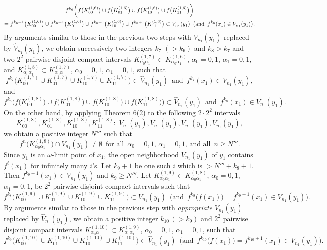 \documentclass[12pt]{article}
\newcommand{\al}{\alpha}
\begin{document}
\begin{multline*}
$$
f^{k_6}\bigg(f\big(K_{00}^{(1,6)}\big) \cup f\big(K_{01}^{(1,6)}\big) \cup f\big(K_{10}^{(1,6)}\big) \cup f\big(K_{11}^{(1,6)}\big)\bigg) \\ = f^{k_6+1}\big(K_{00}^{(1,6)}\big) \cup f^{k_6+1}\big(K_{01}^{(1,6)}\big) \cup f^{k_6+1}\big(K_{10}^{(1,6)}\big) \cup f^{k_6+1}\big(K_{11}^{(1,6)}\big)\subset V_{n_1}(y_1) \,\,\, \big(\text{and} \,\,\, f^{k_6}(x_1) \in V_{n_1}(y_1)\big).
$$
\end{multline*}
\indent By arguments similar to those in the previous two steps with $V_{n_1}(y_1)$ replaced by $\widehat V_{n_1}(y_1)$, we obtain successively two integers $k_7$ $(> k_6)$ and $k_8 > k_7$ and two $2^2$ pairwise disjoint compact intervals $K_{\al_0\al_1}^{(1,7)} \subset K_{\al_0\al_1}^{(1,6)}$, $\al_0 = 0, 1$, $\al_1 = 0, 1$, and $K_{\al_0\al_1}^{(1,8)} \subset K_{\al_0\al_1}^{(1,7)}$, $\al_0 = 0, 1$, $\al_1 = 0, 1$, such that 
$$
f^{k_7}\big(K_{00}^{(1,7)} \cup K_{01}^{(1,7)} \cup K_{10}^{(1,7)} \cup K_{11}^{(1,7)}\big) \subset \widehat V_{n_1}(y_1) \,\,\, \text{and} \,\,\, f^{k_7}(x_1) \in V_{n_1}(y_1),
$$and
$$
f^{k_8}\bigg(f\big(K_{00}^{(1,8)}\big) \cup f\big(K_{01}^{(1,8)}\big) \cup f\big(K_{10}^{(1,8)}\big) \cup f\big(K_{11}^{(1,8)}\big)\bigg) \subset \widehat V_{n_1}(y_1) \,\,\, \text{and} \,\,\, f^{k_8}(x_1) \in V_{n_1}(y_1).%
$$
\indent On the other hand, by applying Theorem 6(2) to the following $2 \cdot 2^2$ intervals
$$
K_{00}^{(1,8)}, K_{01}^{(1,8)}, K_{10}^{(1,8)}, K_{11}^{(1,8)}: \,\, V_{n_1}(y_1), V_{n_1}(y_1), V_{n_1}(y_1), V_{n_1}(y_1),
$$ 
we obtain a positive integer $N'''$ such that 
$$
f^n\big(K_{\al_0\al_1}^{(1,8)}\big) \cap V_{n_1}(y_1) \ne \emptyset \,\,\, \text{for all} \,\,\, \al_0 = 0, 1, \, \al_1 = 0, 1, \, \text{and all} \,\,\, n \ge N'''.
$$
\indent Since $y_1$ is an $\omega$-limit point of $x_1$, the open neighborhood $V_{n_1}(y_1)$ of $y_1$ contains $f^i(x_1)$ for infinitely many $i$'s.  Let $k_9+1$ be one such $i$ which is $> N'''+k_8+1$.  Then $f^{k_9+1}(x_1) \in V_{n_1}(y_1)$ and $k_9 \ge N'''$.  Let $K_{\al_0\al_1}^{(1,9)} \subset K_{\al_0\al_1}^{(1,8)}$, $\al_0 = 0, 1$, $\al_1 = 0, 1$, be $2^2$ pairwise disjoint compact intervals such that 
$$
f^{k_8}\big(K_{00}^{(1,9)} \cup K_{01}^{(1,9)} \cup K_{10}^{(1,9)} \cup K_{11}^{(1,9)}\big) \subset V_{n_1}(y_1) \,\,\, \bigg(\text{and} \,\,\, f^{k_9}\big(f(x_1)\big) = f^{k_9+1}(x_1) \in V_{n_1}(y_1)\bigg).
$$
\indent By arguments similar to those in the previous step with {\it appropriate} $V_{n_1}(y_1)$ replaced by $\widehat V_{n_1}(y_1)$, we obtain a positive integer $k_{10} \, (> k_9)$ and $2^2$ pairwise disjoint compact intervals $K_{\al_0\al_1}^{(1,10)} \subset K_{\al_0\al_1}^{(1,9)}$, $\al_0 = 0, 1$, $\al_1 = 0, 1$, such that
$$
f^{k_9}\big(K_{00}^{(1,10)} \cup K_{01}^{(1,10)} \cup K_{10}^{(1,10)} \cup K_{11}^{(1,10)}\big) \subset \widehat V_{n_1}(y_1) \,\,\, \bigg(\text{and} \,\,\, f^{k_{10}}\big(f(x_1)\big) = f^{k_{10}+1}(x_1) \in V_{n_1}(y_1)\bigg).
$$
\end{document}
